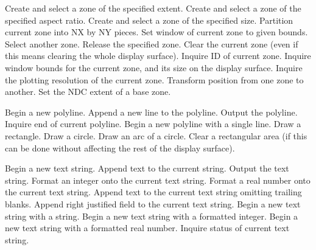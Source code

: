 \documentclass[11pt]{article}
\begin{document}
\begin{routinelist}
   Create and select a zone of the specified extent.
   Create and select a zone of the specified aspect ratio.
   Create and select a zone of the specified size.
   Partition current zone into NX by NY pieces.
   Set window of current zone to given bounds.
   Select another zone.
   Release the specified zone.
   Clear the current zone (even if this means clearing the whole display
   surface).
   Inquire ID of current zone.
   Inquire window bounds for the current zone, and its size on the display
   surface.
   Inquire the plotting resolution of the current zone.
   Transform position from one zone to another.
   Set the NDC extent of a base zone.
\end{routinelist}

\begin{routinelist}
   Begin a new polyline.
   Append a new line to the polyline.
   Output the polyline.
   Inquire end of current polyline.
   Begin a new polyline with a single line.
   Draw a rectangle.
   Draw a circle.
   Draw an arc of a circle.
   Clear a rectangular area (if this can be done without affecting the rest of
   the display surface).
\end{routinelist}

\begin{routinelist}
   Begin a new text string.
   Append text to the current string.
   Output the text string.
   Format an integer onto the current text string.
   Format a real number onto the current text string.
   Append text to the current text string omitting trailing blanks.
   Append right justified field to the current text string.
   Begin a new text string with a string.
   Begin a new text string with a formatted integer.
   Begin a new text string with a formatted real number.
   Inquire status of current text string.
\end{routinelist}
\end{document}
